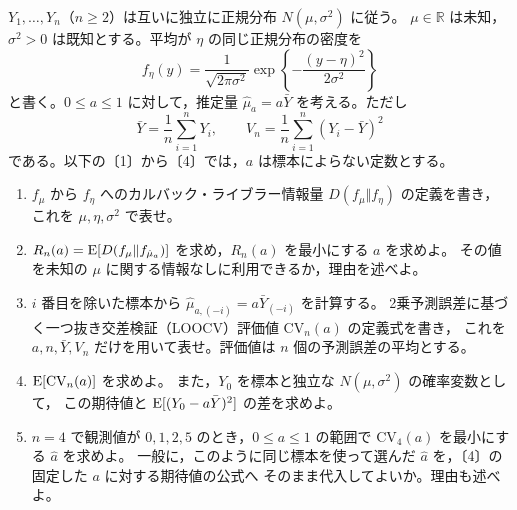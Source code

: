 \documentclass[a4paper,11pt]{ltjsarticle}
\begin{document}
$Y_1,\ldots,Y_n$（$n\geq2$）は互いに独立に正規分布 $N(\mu,\sigma^2)$ に従う。
$\mu\in\mathbb R$ は未知，$\sigma^2>0$ は既知とする。平均が $\eta$ の同じ正規分布の密度を
\[
f_\eta(y)=\frac{1}{\sqrt{2\pi\sigma^2}}
\exp\!\left\{-\frac{(y-\eta)^2}{2\sigma^2}\right\}
\]
と書く。$0\leq a\leq1$ に対して，推定量 $\hat\mu_a=a\bar Y$ を考える。ただし
\[
\bar Y=\frac1n\sum_{i=1}^nY_i,\qquad
V_n=\frac1n\sum_{i=1}^n(Y_i-\bar Y)^2
\]
である。以下の〔1〕から〔4〕では，$a$ は標本によらない定数とする。
\begin{enumerate}
\item $f_\mu$ から $f_\eta$ へのカルバック・ライブラー情報量 $D(f_\mu\Vert f_\eta)$ の定義を書き，
これを $\mu,\eta,\sigma^2$ で表せ。
\item $R_n(a)=\operatorname{E}[D(f_\mu\Vert f_{\hat\mu_a})]$ を求め，$R_n(a)$ を最小にする $a$ を求めよ。
その値を未知の $\mu$ に関する情報なしに利用できるか，理由を述べよ。
\item $i$ 番目を除いた標本から $\hat\mu_{a,(-i)}=a\bar Y_{(-i)}$ を計算する。
2乗予測誤差に基づく一つ抜き交差検証（LOOCV）評価値 $\mathrm{CV}_n(a)$ の定義式を書き，
これを $a,n,\bar Y,V_n$ だけを用いて表せ。評価値は $n$ 個の予測誤差の平均とする。
\item $\operatorname{E}[\mathrm{CV}_n(a)]$ を求めよ。
また，$Y_0$ を標本と独立な $N(\mu,\sigma^2)$ の確率変数として，
この期待値と $\operatorname{E}[(Y_0-a\bar Y)^2]$ の差を求めよ。
\item $n=4$ で観測値が $0,1,2,5$ のとき，$0\leq a\leq1$ の範囲で $\mathrm{CV}_4(a)$ を最小にする
$\hat a$ を求めよ。
一般に，このように同じ標本を使って選んだ $\hat a$ を，〔4〕の固定した $a$ に対する期待値の公式へ
そのまま代入してよいか。理由も述べよ。
\end{enumerate}
\newpage
\end{document}
